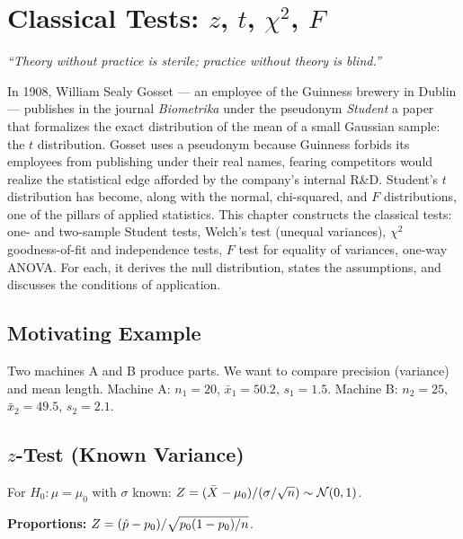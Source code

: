 \chapter{Classical Tests: $z$, $t$, $\chi^2$, $F$}
\label{ch:classical-tests}

\begin{center}
\textit{``Theory without practice is sterile; practice without theory is blind.''}
\end{center}

In 1908, William Sealy Gosset --- an employee of the Guinness brewery in Dublin --- publishes in the journal \emph{Biometrika} under the pseudonym \emph{Student} a paper that formalizes the exact distribution of the mean of a small Gaussian sample: the $t$ distribution. Gosset uses a pseudonym because Guinness forbids its employees from publishing under their real names, fearing competitors would realize the statistical edge afforded by the company's internal R\&D. Student's $t$ distribution has become, along with the normal, chi-squared, and $F$ distributions, one of the pillars of applied statistics. This chapter constructs the classical tests: one- and two-sample Student tests, Welch's test (unequal variances), $\chi^2$ goodness-of-fit and independence tests, $F$ test for equality of variances, one-way ANOVA. For each, it derives the null distribution, states the assumptions, and discusses the conditions of application.

\section{Motivating Example}
Two machines A and B produce parts. We want to compare precision (variance) and mean length. Machine A: $n_1=20$, $\bar{x}_1=50.2$, $s_1=1.5$. Machine B: $n_2=25$, $\bar{x}_2=49.5$, $s_2=2.1$.

\section{$z$-Test (Known Variance)}

For $H_0:\mu=\mu_0$ with $\sigma$ known: $Z = (\bar{X}-\mu_0)/(\sigma/\sqrt{n}) \sim \mathcal{N}(0,1)$.

\textbf{Proportions:} $Z = (\hat{p}-p_0)/\sqrt{p_0(1-p_0)/n}$.

